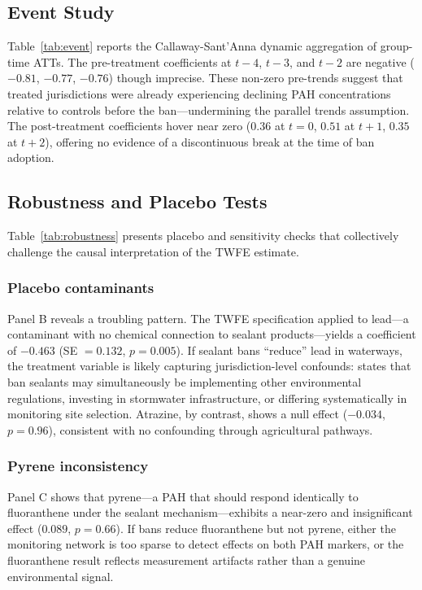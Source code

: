 \documentclass[12pt]{article}
\begin{document}
\subsection{Event Study}



Table~\ref{tab:event} reports the Callaway-Sant'Anna dynamic aggregation of group-time ATTs. The pre-treatment coefficients at $t-4$, $t-3$, and $t-2$ are negative ($-0.81$, $-0.77$, $-0.76$) though imprecise. These non-zero pre-trends suggest that treated jurisdictions were already experiencing declining PAH concentrations relative to controls before the ban---undermining the parallel trends assumption. The post-treatment coefficients hover near zero ($0.36$ at $t=0$, $0.51$ at $t+1$, $0.35$ at $t+2$), offering no evidence of a discontinuous break at the time of ban adoption.

\subsection{Robustness and Placebo Tests}



Table~\ref{tab:robustness} presents placebo and sensitivity checks that collectively challenge the causal interpretation of the TWFE estimate.

\subsubsection*{Placebo contaminants} Panel B reveals a troubling pattern. The TWFE specification applied to lead---a contaminant with no chemical connection to sealant products---yields a coefficient of $-0.463$ (SE $= 0.132$, $p = 0.005$). If sealant bans ``reduce'' lead in waterways, the treatment variable is likely capturing jurisdiction-level confounds: states that ban sealants may simultaneously be implementing other environmental regulations, investing in stormwater infrastructure, or differing systematically in monitoring site selection. Atrazine, by contrast, shows a null effect ($-0.034$, $p = 0.96$), consistent with no confounding through agricultural pathways.

\subsubsection*{Pyrene inconsistency} Panel C shows that pyrene---a PAH that should respond identically to fluoranthene under the sealant mechanism---exhibits a near-zero and insignificant effect ($0.089$, $p = 0.66$). If bans reduce fluoranthene but not pyrene, either the monitoring network is too sparse to detect effects on both PAH markers, or the fluoranthene result reflects measurement artifacts rather than a genuine environmental signal.
\end{document}
